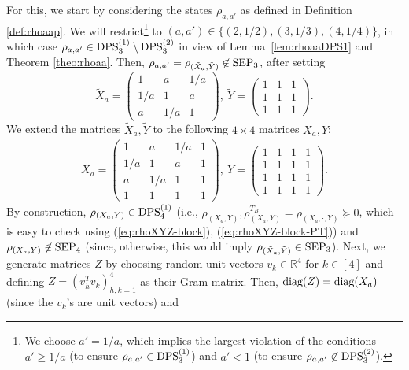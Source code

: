 \documentclass[11pt]{article}
\newcommand{\R}{\ensuremath{\mathbb{R}}}   %
\newcommand{\SEP}{\text{\rm SEP}}
\newcommand{\DPS}{\text{\rm DPS}}
\newcommand{\diag}{\text{\rm diag}}
\theoremstyle{plain}
\begin{document}
For this, we start by considering the states $\rho_{a,a'}$ as defined in Definition \ref{def:rhoaap}. We will restrict\footnote{We choose $a'= 1/a$, which implies the largest violation of the conditions $a'\ge 1/a$ (to ensure $\rho_{a,a'}\in\DPS^{(1)}_3$) and $a'<1$ (to ensure $\rho_{a,a'}\not\in\DPS^{(2)}_3$).
}
to $(a,a')\in\{(2,1/2),(3,1/3),(4,1/4)\}$, in which case $\rho_{a,a'}\in\DPS^{(1)}_3\setminus\DPS^{(2)}_3$ in view of  Lemma~\ref{lem:rhoaaDPS1} and Theorem \ref{theo:rhoaa}.
 Then, $\rho_{a,a'}= \rho_{(\tilde X_{a},\tilde Y)}\not\in\SEP_3$, after setting
  $$\tilde X_{a}=\begin{pmatrix}
            1&a&1/a\\
            1/a&1&a\\
            a&1/a&1
        \end{pmatrix},\
        \tilde Y=\begin{pmatrix}
            1&1&1\\
            1&1&1\\
            1&1&1
        \end{pmatrix}.$$
We   extend the matrices $\tilde X_{a},\tilde Y$ to the following $4\times 4$ matrices $X_{a},Y$:
\begin{align}\label{eq:XYaap}
X_{a}=\begin{pmatrix}
            1&a&1/a&1\\
            1/a&1&a&1\\
            a&1/a&1&1\\
            1&1&1&1
        \end{pmatrix},\
        Y=\begin{pmatrix}
            1&1&1&1\\
            1&1&1&1\\
            1&1&1&1\\
            1&1&1&1
        \end{pmatrix}.
        \end{align}
By construction,     $\rho_{(X_{a},Y)}\in\DPS^{(1)}_4$ (i.e., $\rho_{(X_{a},Y)}, \rho_{(X_{a},Y)}^{T_B}=\rho_{(X_{a},\cdot,Y)}\succeq 0$, which is easy to check using (\ref{eq:rhoXYZ-block}), (\ref{eq:rhoXYZ-block-PT})) and $\rho_{(X_{a},Y)}\not\in\SEP_4$ (since, otherwise, this would imply  $\rho_{(\tilde X_{a},\tilde Y)}\in\SEP_3$). Next, we generate matrices $Z$ by choosing random unit vectors $v_k\in\R^4$ for $k\in[4]$ and  defining $Z=( v_h^Tv_k )_{h,k=1}^4$ as their Gram matrix. Then, $\diag(Z)=\diag(X_{a})$  (since the $v_k$'s are unit vectors) and  %
\end{document}
